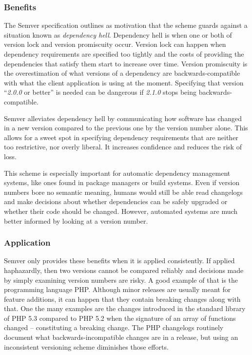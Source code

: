 \documentclass{l4proj}
\begin{document}
\subsubsection{Benefits}

The Semver specification outlines as motivation that the scheme guards
against a situation known as \textit{dependency hell}. Dependency hell
is when one or both of version lock and version promiscuity occur.
Version lock can happen when dependency requirements are specified too
tightly and the costs of providing the dependencies that satisfy them
start to increase over time. Version promiscuity is the overestimation
of what versions of a dependency are backwards-compatible with what
the client application is using at the moment. Specifying that version
``\textit{2.0.0} or better'' is needed can be dangerous if
\textit{2.1.0} stops being backwards-compatible.

Semver alleviates dependency hell by communicating how software has
changed in a new version compared to the previous one by the version
number alone. This allows for a sweet spot in specifying dependency
requirements that are neither too restrictive, nor overly liberal.
It increases confidence and reduces the risk of loss.

This scheme is especially important for automatic dependency
management systems, like ones found in package managers or build
systems. Even if version numbers bore no semantic meaning, humans
would still be able read changelogs and make decisions about whether
dependencies can be safely upgraded or whether their code should be
changed. However, automated systems are much better informed by
looking at a version number.

\subsubsection{Application}


Semver only provides these benefits when it is applied consistently.
If applied haphazardly, then two versions cannot be compared reliably
and decisions made by simply examining version numbers are risky. A
good example of that is the programming language PHP. Although minor
releases are usually meant for feature additions, it can happen that
they contain breaking changes along with that. One the many examples
are the changes introduced in the standard library of PHP 5.3 compared
to PHP 5.2 \cite{PHPChangelog} when the signature of an array of
functions changed -- constituting a breaking change. The PHP
changelogs routinely document what backwards-incompatible changes are
in a release, but using an inconsistent versioning scheme diminishes
those efforts.
\end{document}

